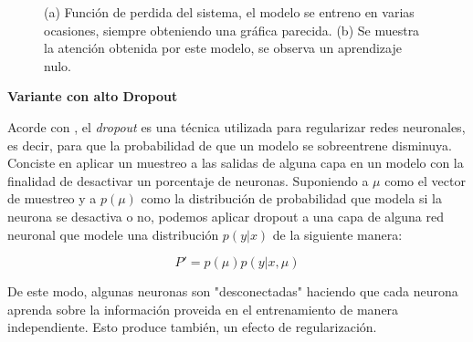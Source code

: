 \begin{figure}[H]
    \centering
    \caption{(a) Función de perdida del sistema, el modelo se entreno en varias ocasiones, siempre obteniendo una gráfica parecida. (b) Se muestra la atención obtenida por este modelo, se observa un aprendizaje nulo.}
    \label{fig:gru-bad}
\end{figure}


\vspace{1em}
\textbf{Variante con alto Dropout}
\vspace{1em}

Acorde con \cite{deeplearningbook}, el \textit{dropout} es una técnica utilizada para regularizar redes neuronales, es decir, para que la probabilidad de que un modelo se sobreentrene disminuya. Conciste en aplicar un muestreo a las salidas de alguna capa en un modelo con la finalidad de desactivar un porcentaje de neuronas. Suponiendo a $\mu$ como el vector de muestreo y a $p(\mu)$ como la distribución de probabilidad que modela si la neurona se desactiva o no, podemos aplicar dropout a una capa de alguna red neuronal que modele una distribución $p(y|x)$ de la siguiente manera:

\begin{equation}
    P' = p(\mu)p(y|x,\mu)
\end{equation}

De este modo, algunas neuronas \cite{harvard} son "desconectadas" haciendo que cada neurona aprenda sobre la información proveida en el entrenamiento de manera independiente. Esto produce también, un efecto de regularización.

